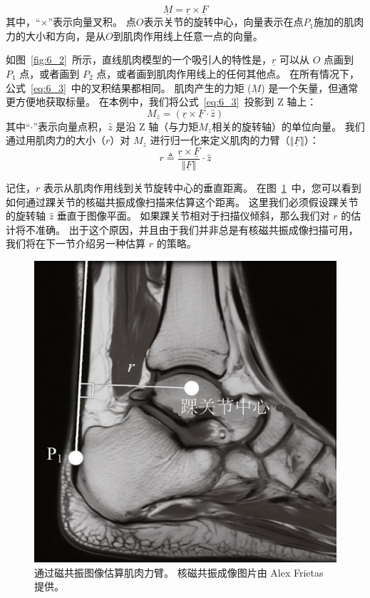 \begin{equation}
	\underline{M} = \underline{r} \times \underline{F}
	\label{eq:6_3}
\end{equation}
%
其中，“$\times$”表示向量叉积。
点$O$表示关节的旋转中心，向量表示在点$P_1$施加的肌肉力的大小和方向，是从$O$到肌肉作用线上任意一点的向量。


如图~\ref{fig:6_2}~所示，直线肌肉模型的一个吸引人的特性是，$\underline{r}$ 可以从 $O$ 点画到 $P_1$ 点，或者画到 $P_2$ 点，或者画到肌肉作用线上的任何其他点。
在所有情况下，公式~\ref{eq:6_3}~中的叉积结果都相同。
肌肉产生的力矩 ($\underline{M}$) 是一个矢量，但通常更方便地获取标量。
在本例中，我们将公式~\ref{eq:6_3}~投影到 Z 轴上：
%
\begin{equation}
	M_z = ( \underline{r} \times \underline{F} \cdot \hat{z} )
	\label{eq:6_4}
\end{equation}
%
其中“$\cdot$”表示向量点积，$\hat{z}$ 是沿 Z 轴（与力矩$M_z$相关的旋转轴）的单位向量。
我们通过用肌肉力的大小（$r$）对 $M_z$ 进行归一化来定义肌肉的力臂（$ \Vert \underline{F} \Vert $）：
%
\begin{equation}
	r \triangleq 
		\frac{
			\underline{r} \times \underline{F}
		}{
			\Vert \underline{F} \Vert
		}
		\cdot
		\hat{z}
	\label{eq:6_5}
\end{equation}


记住，$r$ 表示从肌肉作用线到关节旋转中心的垂直距离。
在图~\ref{fig:6_3}~中，您可以看到如何通过踝关节的核磁共振成像扫描来估算这个距离。
这里我们必须假设踝关节的旋转轴 $\hat{z}$ 垂直于图像平面。
如果踝关节相对于扫描仪倾斜，那么我们对 $r$ 的估计将不准确。
出于这个原因，并且由于我们并非总是有核磁共振成像扫描可用，我们将在下一节介绍另一种估算 $r$ 的策略。


\begin{figure}[!htb]
	\centering
	\includegraphics[width=0.4\linewidth]{chap6/6_3}
	\caption{通过磁共振图像估算肌肉力臂。
		核磁共振成像图片由 Alex Frietas 提供。 \label{fig:6_3}}
\end{figure}


